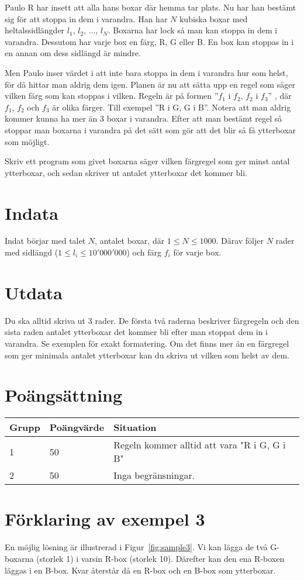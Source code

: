 
Paulo R har insett att alla hans boxar där hemma tar plats. Nu har han bestämt
sig för att stoppa in dem i varandra. Han har $N$ kubiska boxar med
heltalssidlängder $l_1$, $l_2$, $\ldots$, $l_N$. Boxarna har lock så man kan stoppa in
dem i varandra. Dessutom har varje box en färg, R, G eller B. 
En box kan stoppas in i en annan om dess sidlängd är mindre.

Men Paulo inser värdet i att inte bara stoppa in dem i varandra hur som helst,
för då hittar man aldrig dem igen.
Planen är nu att sätta upp en regel som säger vilken färg som kan stoppas i
vilken. Regeln är på formen ''$f_1$ i $f_2$, $f_2$ i $f_3$'' , 
där $f_1$, $f_2$ och $f_3$ är olika färger. Till exempel ''R i
G, G i B''. Notera att man aldrig kommer kunna ha mer än 3 boxar i
varandra. Efter att man bestämt regel så stoppar man boxarna i varandra på det sätt
som gör att det blir så få ytterboxar som möjligt.

Skriv ett program som givet boxarna säger vilken färgregel som ger minst antal
ytterboxar, och sedan skriver ut antalet ytterboxar det kommer bli.

\section*{Indata}

Indat börjar med talet $N$, antalet boxar, där $1\le N \le 1000$. Därav följer $N$ rader med sidlängd
($1 \le l_i \le 10'000'000$) och färg $f_i$ för varje box.

\section*{Utdata}

Du ska alltid skriva ut 3 rader. De första två raderna beskriver färgregeln
och den sista raden antalet ytterboxar det kommer bli efter man stoppat dem in i
varandra. Se exemplen för exakt formatering. Om det finns mer än en färgregel 
som ger minimala antalet ytterboxar kan du skriva ut vilken som helst av dem.

\section*{Poängsättning}

\begin{tabular}{| l | l | l |}
\hline
Grupp & Poängvärde & Situation \\ \hline
1     & 50         & Regeln kommer alltid att vara "R i G, G i B" \\ \hline
2     & 50         & Inga begränsningar. \\ \hline
\end{tabular}

\section*{Förklaring av exempel 3}
En möjlig lösning är illustrerad i Figur~\ref{fig:sample3}.
Vi kan lägga de två G-boxarna (storlek 1) i varsin R-box (storlek 10).
Därefter kan den ena R-boxen läggas i en B-box.
Kvar återstår då en R-box och en B-box som ytterboxar.
